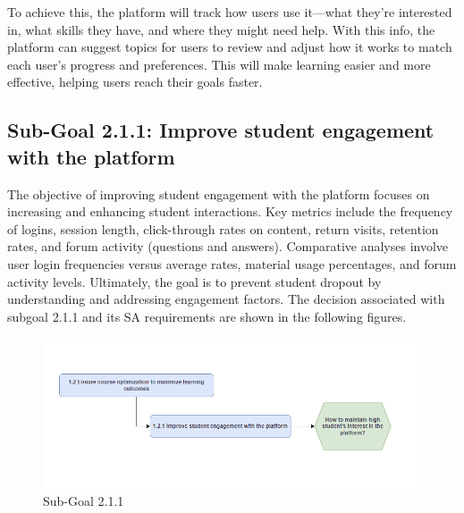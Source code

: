 To achieve this, the platform will track how users use it—what they're interested in, what skills they have, and where they might need help. With this info, the platform can suggest topics for users to review and adjust how it works to match each user's progress and preferences. This will make learning easier and more effective, helping users reach their goals faster.

\subsection{Sub-Goal 2.1.1: Improve student engagement with the platform}
The objective of improving student engagement with the platform focuses on increasing and enhancing student interactions. Key metrics include the frequency of logins, session length, click-through rates on content, return visits, retention rates, and forum activity (questions and answers). Comparative analyses involve user login frequencies versus average rates, material usage percentages, and forum activity levels. Ultimately, the goal is to prevent student dropout by understanding and addressing engagement factors.
The decision associated with subgoal 2.1.1 and its SA requirements are shown in the following figures.
\begin{figure}[H]
    \centering
    \includegraphics[width=\textwidth]{./assets/subgoal_1.2.1.png}
    \caption{Sub-Goal 2.1.1}
    \label{fig:subgoal1.2.1}
\end{figure}

